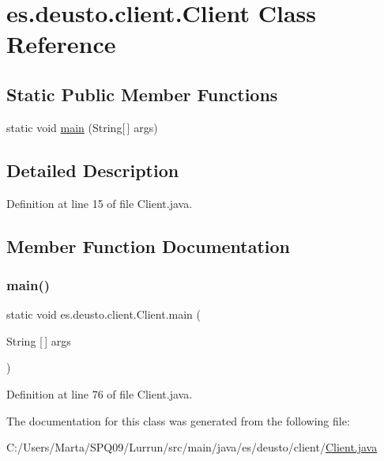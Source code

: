 \hypertarget{classes_1_1deusto_1_1client_1_1_client}{}\section{es.\+deusto.\+client.\+Client Class Reference}
\label{classes_1_1deusto_1_1client_1_1_client}
\subsection*{Static Public Member Functions}
\begin{DoxyCompactItemize}
\item 
static void \hyperlink{classes_1_1deusto_1_1client_1_1_client_a69a7526d0af9cb2341f4bf341b501152}{main} (String\mbox{[}$\,$\mbox{]} args)
\end{DoxyCompactItemize}


\subsection{Detailed Description}


Definition at line 15 of file Client.\+java.



\subsection{Member Function Documentation}
\mbox{\label{classes_1_1deusto_1_1client_1_1_client_a69a7526d0af9cb2341f4bf341b501152}} 
\subsubsection{\texorpdfstring{main()}{main()}}
{\footnotesize\ttfamily static void es.\+deusto.\+client.\+Client.\+main (\begin{DoxyParamCaption}\item[{String \mbox{[}$\,$\mbox{]}}]{args }\end{DoxyParamCaption})\hspace{0.3cm}{\ttfamily [static]}}



Definition at line 76 of file Client.\+java.



The documentation for this class was generated from the following file\+:\begin{DoxyCompactItemize}
\item 
C\+:/\+Users/\+Marta/\+S\+P\+Q09/\+Lurrun/src/main/java/es/deusto/client/\hyperlink{_client_8java}{Client.\+java}\end{DoxyCompactItemize}
